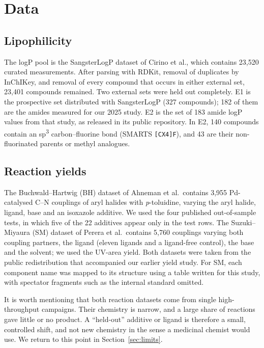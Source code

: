 \documentclass[11pt,letterpaper]{article}
\begin{document}
\section{Data}

\subsection{Lipophilicity}

The logP pool is the SangsterLogP dataset of Cirino et al.,\cite{cirino2026,sangsterzenodo} which contains 23,520 curated measurements. After parsing with RDKit,\cite{rdkit} removal of duplicates by InChIKey, and removal of every compound that occurs in either external set, 23,401 compounds remained. Two external sets were held out completely. E1 is the prospective set distributed with SangsterLogP (327 compounds); 182 of them are the amides measured for our 2025 study.\cite{gurbych2025} E2 is the set of 183 amide logP values from that study, as released in its public repository. In E2, 140 compounds contain an sp\textsuperscript{3} carbon--fluorine bond (SMARTS \texttt{[CX4]F}), and 43 are their non-fluorinated parents or methyl analogues.

\subsection{Reaction yields}

The Buchwald--Hartwig (BH) dataset of Ahneman et al.\ contains 3,955 Pd-catalysed C--N couplings of aryl halides with \textit{p}-toluidine, varying the aryl halide, ligand, base and an isoxazole additive.\cite{ahneman2018} We used the four published out-of-sample tests, in which five of the 22 additives appear only in the test rows. The Suzuki--Miyaura (SM) dataset of Perera et al.\ contains 5,760 couplings varying both coupling partners, the ligand (eleven ligands and a ligand-free control), the base and the solvent; we used the UV-area yield.\cite{perera2018} Both datasets were taken from the public redistribution that accompanied our earlier yield study.\cite{yarish2023} For SM, each component name was mapped to its structure using a table written for this study, with spectator fragments such as the internal standard omitted.

It is worth mentioning that both reaction datasets come from single high-throughput campaigns. Their chemistry is narrow, and a large share of reactions gave little or no product. A ``held-out'' additive or ligand is therefore a small, controlled shift, and not new chemistry in the sense a medicinal chemist would use. We return to this point in Section~\ref{sec:limits}.
\end{document}
